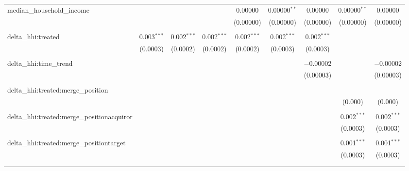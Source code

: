 \begin{table}[H]
{\begin{tabular}{@{\extracolsep{5pt}}lcccccccc}
  median\_household\_income &  &  &  & 0.00000 & 0.00000$^{**}$ & 0.00000 & 0.00000$^{**}$ & 0.00000 \\  

   &  &  &  & (0.00000) & (0.00000) & (0.00000) & (0.00000) & (0.00000) \\  

   & & & & & & & & \\  

  delta\_hhi:treated & 0.003$^{***}$ & 0.002$^{***}$ & 0.002$^{***}$ & 0.002$^{***}$ & 0.002$^{***}$ & 0.002$^{***}$ &  &  \\  

   & (0.0003) & (0.0002) & (0.0002) & (0.0002) & (0.0003) & (0.0003) &  &  \\  

   & & & & & & & & \\  

  delta\_hhi:time\_trend &  &  &  &  &  & $-$0.00002 &  & $-$0.00002 \\  

   &  &  &  &  &  & (0.00003) &  & (0.00003) \\  

   & & & & & & & & \\  

  delta\_hhi:treated:merge\_position &  &  &  &  &  &  &  &  \\  

   &  &  &  &  &  &  & (0.000) & (0.000) \\  

   & & & & & & & & \\  

  delta\_hhi:treated:merge\_positionacquiror &  &  &  &  &  &  & 0.002$^{***}$ & 0.002$^{***}$ \\  

   &  &  &  &  &  &  & (0.0003) & (0.0003) \\  

   & & & & & & & & \\  

  delta\_hhi:treated:merge\_positiontarget &  &  &  &  &  &  & 0.001$^{***}$ & 0.001$^{***}$ \\  

   &  &  &  &  &  &  & (0.0003) & (0.0003) \\  

   & & & & & & & & \\  

 \hline \\[-1.8ex]  


\end{tabular}}
\end{table}
